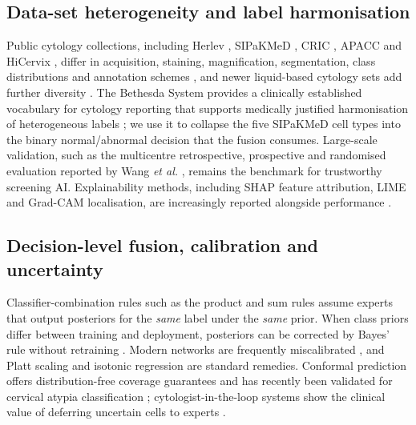 \documentclass[lettersize,journal]{IEEEtran}
\begin{document}
\subsection{Data-set heterogeneity and label harmonisation}
Public cytology collections, including Herlev \cite{jantzen2005herlev}, SIPaKMeD \cite{plissiti2018sipakmed}, CRIC \cite{rezende2021cric}, APACC \cite{kupas2024apacc} and HiCervix \cite{cai2024hicervix}, differ in acquisition, staining, magnification, segmentation, class distributions and annotation schemes \cite{coskun2026robust}, and newer liquid-based cytology sets add further diversity \cite{hussain2020liquidbased}. The Bethesda System provides a clinically established vocabulary for cytology reporting that supports medically justified harmonisation of heterogeneous labels \cite{solomon2002bethesda,nayar2015bethesda}; we use it to collapse the five SIPaKMeD cell types into the binary normal/abnormal decision that the fusion consumes. Large-scale validation, such as the multicentre retrospective, prospective and randomised evaluation reported by Wang \emph{et al.} \cite{wang2024aiccs}, remains the benchmark for trustworthy screening AI. Explainability methods, including SHAP feature attribution, LIME and Grad-CAM localisation, are increasingly reported alongside performance \cite{vallescoral2026review}.

\subsection{Decision-level fusion, calibration and uncertainty}
Classifier-combination rules such as the product and sum rules \cite{kittler1998combining} assume experts that output posteriors for the \emph{same} label under the \emph{same} prior. When class priors differ between training and deployment, posteriors can be corrected by Bayes' rule without retraining \cite{saerens2002adjusting,lipton2018labelshift}. Modern networks are frequently miscalibrated \cite{guo2017calibration}, and Platt scaling \cite{platt1999probabilistic} and isotonic regression \cite{zadrozny2002transforming} are standard remedies. Conformal prediction offers distribution-free coverage guarantees \cite{vovk2005algorithmic,angelopoulos2023conformal} and has recently been validated for cervical atypia classification \cite{hagos2026conformal}; cytologist-in-the-loop systems show the clinical value of deferring uncertain cells to experts \cite{xue2023arcytologist}.
\end{document}
